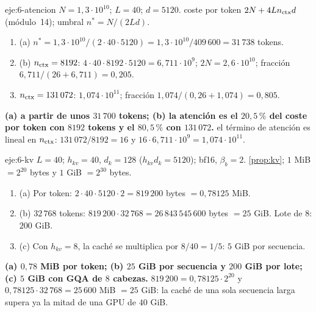 \begin{solucion}{eje:6-atencion}
\datos $N=1{,}3\cdot 10^{10}$; $L=40$; $d=5120$.
\planteamiento coste por token $2N+4Ln_{\mathrm{ctx}} d$ (módulo~14); umbral $n^{*}=N/(2Ld)$.
\pasos
\begin{enumerate}[label=\arabic*.]
  \item (a) $n^{*}=1{,}3\cdot 10^{10}/(2\cdot 40\cdot 5120)=1{,}3\cdot 10^{10}/409\,600=31\,738$ tokens.
  \item (b) $n_{\mathrm{ctx}}=8192$: $4\cdot 40\cdot 8192\cdot 5120=6{,}711\cdot 10^{9}$; $2N=2{,}6\cdot 10^{10}$; fracción $6{,}711/(26+6{,}711)=0{,}205$.
  \item $n_{\mathrm{ctx}}=131\,072$: $1{,}074\cdot 10^{11}$; fracción $1{,}074/(0{,}26+1{,}074)=0{,}805$.
\end{enumerate}
\resultado \textbf{(a) a partir de unos $31\,700$ tokens; (b) la atención es el $20{,}5\,\%$ del coste por token con $8192$ tokens y el $80{,}5\,\%$ con $131\,072$.}
\comprobacion el término de atención es lineal en $n_{\mathrm{ctx}}$: $131\,072/8192=16$ y $16\cdot 6{,}711\cdot 10^{9}=1{,}074\cdot 10^{11}$.
\end{solucion}

\begin{solucion}{eje:6-kv}
\datos $L=40$; $h_{kv}=40$, $d_k=128$ ($h_{kv}d_k=5120$); bf16, $\beta_b=2$.
\planteamiento \cref{prop:kv}; $1$ MiB $=2^{20}$ bytes y $1$ GiB $=2^{30}$ bytes.
\pasos
\begin{enumerate}[label=\arabic*.]
  \item (a) Por token: $2\cdot 40\cdot 5120\cdot 2=819\,200$ bytes $=0{,}78125$ MiB.
  \item (b) $32\,768$ tokens: $819\,200\cdot 32\,768=26\,843\,545\,600$ bytes $=25$ GiB. Lote de $8$: $200$ GiB.
  \item (c) Con $h_{kv}=8$, la caché se multiplica por $8/40=1/5$: $5$ GiB por secuencia.
\end{enumerate}
\resultado \textbf{(a) $0{,}78$ MiB por token; (b) $25$ GiB por secuencia y $200$ GiB por lote; (c) $5$ GiB con GQA de $8$ cabezas.}
\comprobacion $819\,200=0{,}78125\cdot 2^{20}$ y $0{,}78125\cdot 32\,768=25\,600$ MiB $=25$ GiB: la caché de una sola secuencia larga supera ya la mitad de una GPU de $40$ GiB.
\end{solucion}

